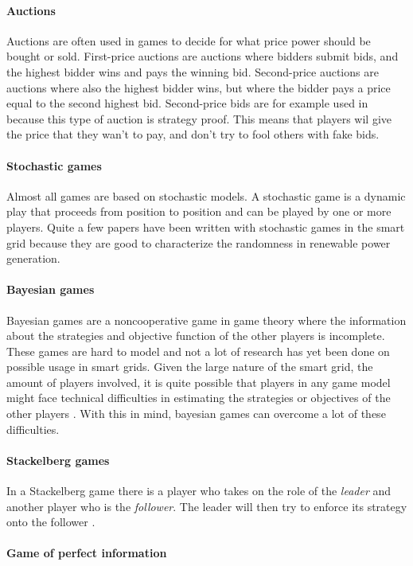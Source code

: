 \paragraph{Auctions}
Auctions are often used in games to decide for what price power should be bought or sold. First-price auctions are auctions where bidders submit bids, and the highest bidder wins and pays the winning bid. Second-price auctions are auctions where also the highest bidder wins, but where the bidder pays a price equal to the second highest bid. Second-price bids are for example used in \cite{SaadHanPoorEtAl2011} because this type of auction is strategy proof. This means that players wil give the price that they wan't to pay, and don't try to fool others with fake bids.
\paragraph{Stochastic games}
Almost all games are based on stochastic models. A stochastic game is a dynamic play that proceeds from position to position \cite{Shapley1953} and can be played by one or more players. Quite a few papers have been written with stochastic games in the smart grid \cite{LiangZhuang2014} because they are good to characterize the randomness in renewable power generation.  
\paragraph{Bayesian games}
Bayesian games are a noncooperative game in game theory where the information about the strategies and objective function of the other players is incomplete. These games are hard to model and not a lot of research has yet been done on possible usage in smart grids. Given the large nature of the smart grid, the amount of players involved, it is quite possible that players in any game model might face technical difficulties in estimating the strategies or objectives of the other players \cite{keypaper}. With this in mind, bayesian games can overcome a lot of these difficulties. 
\paragraph{Stackelberg games}
In a Stackelberg game there is a player who takes on the role of the \textit{leader} and another player who is the \textit{follower}. The leader will then try to enforce its strategy onto the follower \cite{ShohamLeyton-Brown2008}.

\paragraph{Game of perfect information}


